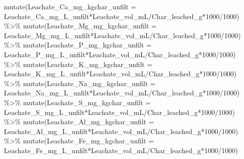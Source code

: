 \documentclass[
]{article}
\newenvironment{Shaded}{\begin{snugshade}}{\end{snugshade}}
\newcommand{\AttributeTok}[1]{\textcolor[rgb]{0.77,0.63,0.00}{#1}}
\newcommand{\DecValTok}[1]{\textcolor[rgb]{0.00,0.00,0.81}{#1}}
\newcommand{\FunctionTok}[1]{\textcolor[rgb]{0.00,0.00,0.00}{#1}}
\newcommand{\NormalTok}[1]{#1}
\newcommand{\SpecialCharTok}[1]{\textcolor[rgb]{0.00,0.00,0.00}{#1}}
\begin{document}
\begin{Shaded}
\begin{Highlighting}[]
  \FunctionTok{mutate}\NormalTok{(}\AttributeTok{Leachate\_Ca\_mg\_kgchar\_unfilt =}\NormalTok{ Leachate\_Ca\_mg\_L\_unfilt}\SpecialCharTok{*}\NormalTok{Leachate\_vol\_mL}\SpecialCharTok{/}\NormalTok{Char\_leached\_g}\SpecialCharTok{*}\DecValTok{1000}\SpecialCharTok{/}\DecValTok{1000}\NormalTok{) }\SpecialCharTok{\%\textgreater{}\%}
  \FunctionTok{mutate}\NormalTok{(}\AttributeTok{Leachate\_Mg\_mg\_kgchar\_unfilt  =}\NormalTok{ Leachate\_Mg\_mg\_L\_unfilt}\SpecialCharTok{*}\NormalTok{Leachate\_vol\_mL}\SpecialCharTok{/}\NormalTok{Char\_leached\_g}\SpecialCharTok{*}\DecValTok{1000}\SpecialCharTok{/}\DecValTok{1000}\NormalTok{) }\SpecialCharTok{\%\textgreater{}\%}
  \FunctionTok{mutate}\NormalTok{(}\AttributeTok{Leachate\_P\_mg\_kgchar\_unfilt =}\NormalTok{ Leachate\_P\_mg\_L\_unfilt}\SpecialCharTok{*}\NormalTok{Leachate\_vol\_mL}\SpecialCharTok{/}\NormalTok{Char\_leached\_g}\SpecialCharTok{*}\DecValTok{1000}\SpecialCharTok{/}\DecValTok{1000}\NormalTok{) }\SpecialCharTok{\%\textgreater{}\%}
  \FunctionTok{mutate}\NormalTok{(}\AttributeTok{Leachate\_K\_mg\_kgchar\_unfilt  =}\NormalTok{ Leachate\_K\_mg\_L\_unfilt}\SpecialCharTok{*}\NormalTok{Leachate\_vol\_mL}\SpecialCharTok{/}\NormalTok{Char\_leached\_g}\SpecialCharTok{*}\DecValTok{1000}\SpecialCharTok{/}\DecValTok{1000}\NormalTok{) }\SpecialCharTok{\%\textgreater{}\%}
  \FunctionTok{mutate}\NormalTok{(}\AttributeTok{Leachate\_Na\_mg\_kgchar\_unfilt  =}\NormalTok{ Leachate\_Na\_mg\_L\_unfilt}\SpecialCharTok{*}\NormalTok{Leachate\_vol\_mL}\SpecialCharTok{/}\NormalTok{Char\_leached\_g}\SpecialCharTok{*}\DecValTok{1000}\SpecialCharTok{/}\DecValTok{1000}\NormalTok{) }\SpecialCharTok{\%\textgreater{}\%}
  \FunctionTok{mutate}\NormalTok{(}\AttributeTok{Leachate\_S\_mg\_kgchar\_unfilt  =}\NormalTok{ Leachate\_S\_mg\_L\_unfilt}\SpecialCharTok{*}\NormalTok{Leachate\_vol\_mL}\SpecialCharTok{/}\NormalTok{Char\_leached\_g}\SpecialCharTok{*}\DecValTok{1000}\SpecialCharTok{/}\DecValTok{1000}\NormalTok{) }\SpecialCharTok{\%\textgreater{}\%}
  \FunctionTok{mutate}\NormalTok{(}\AttributeTok{Leachate\_Al\_mg\_kgchar\_unfilt  =}\NormalTok{ Leachate\_Al\_mg\_L\_unfilt}\SpecialCharTok{*}\NormalTok{Leachate\_vol\_mL}\SpecialCharTok{/}\NormalTok{Char\_leached\_g}\SpecialCharTok{*}\DecValTok{1000}\SpecialCharTok{/}\DecValTok{1000}\NormalTok{) }\SpecialCharTok{\%\textgreater{}\%}
  \FunctionTok{mutate}\NormalTok{(}\AttributeTok{Leachate\_Fe\_mg\_kgchar\_unfilt =}\NormalTok{ Leachate\_Fe\_mg\_L\_unfilt}\SpecialCharTok{*}\NormalTok{Leachate\_vol\_mL}\SpecialCharTok{/}\NormalTok{Char\_leached\_g}\SpecialCharTok{*}\DecValTok{1000}\SpecialCharTok{/}\DecValTok{1000}\NormalTok{)}


\end{Highlighting}
\end{Shaded}
\end{document}
